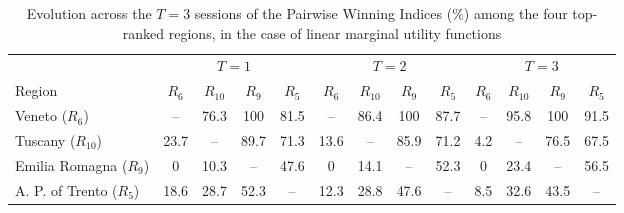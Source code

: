 \begin{table}[h!]
\centering
\footnotesize
\caption{Evolution across the $T=3$ sessions of the Pairwise Winning Indices (\%) among the four top-ranked regions, in the case of linear marginal utility functions}
\label{tab:pwi_evo_lin}
\begin{tabularx}{\textwidth}{l|CCCC|CCCC|CCCC}
\toprule
&&&\\
\cmidrule(lr){2-5}\cmidrule(lr){6-9}\cmidrule(lr){10-13}
Region&$R_{6}$&$R_{10}$&$R_{9}$&$R_{5}$&$R_{6}$&$R_{10}$&$R_{9}$&$R_{5}$&$R_{6}$&$R_{10}$&$R_{9}$&$R_{5}$\\
\midrule
Veneto ($R_{6}$)&--&76.3&100&81.5&--&86.4&100&87.7&--&95.8&100&91.5\\
Tuscany ($R_{10}$)&23.7&--&89.7&71.3&13.6&--&85.9&71.2&4.2&--&76.5&67.5\\
Emilia Romagna ($R_{9}$)&0&10.3&--&47.6&0&14.1&--&52.3&0&23.4&--&56.5\\
A. P. of Trento ($R_{5}$)&18.6&28.7&52.3&--&12.3&28.8&47.6&--&8.5&32.6&43.5&--\\
\bottomrule
\end{tabularx}
\end{table}
